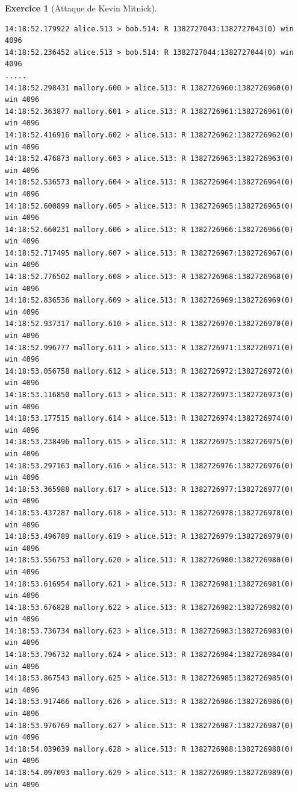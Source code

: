 \documentclass[a4paper,9pt]{article}
\theoremstyle{plain}
\theoremstyle{definition}
\newtheorem{exercice}{Exercice}
\begin{document}
\begin{exercice}[Attaque de Kevin Mitnick]
\begin{verbatim}
14:18:52.179922 alice.513 > bob.514: R 1382727043:1382727043(0) win 4096
14:18:52.236452 alice.513 > bob.514: R 1382727044:1382727044(0) win 4096
.....
14:18:52.298431 mallory.600 > alice.513: R 1382726960:1382726960(0) win 4096
14:18:52.363877 mallory.601 > alice.513: R 1382726961:1382726961(0) win 4096
14:18:52.416916 mallory.602 > alice.513: R 1382726962:1382726962(0) win 4096
14:18:52.476873 mallory.603 > alice.513: R 1382726963:1382726963(0) win 4096
14:18:52.536573 mallory.604 > alice.513: R 1382726964:1382726964(0) win 4096
14:18:52.600899 mallory.605 > alice.513: R 1382726965:1382726965(0) win 4096
14:18:52.660231 mallory.606 > alice.513: R 1382726966:1382726966(0) win 4096
14:18:52.717495 mallory.607 > alice.513: R 1382726967:1382726967(0) win 4096
14:18:52.776502 mallory.608 > alice.513: R 1382726968:1382726968(0) win 4096
14:18:52.836536 mallory.609 > alice.513: R 1382726969:1382726969(0) win 4096
14:18:52.937317 mallory.610 > alice.513: R 1382726970:1382726970(0) win 4096
14:18:52.996777 mallory.611 > alice.513: R 1382726971:1382726971(0) win 4096
14:18:53.056758 mallory.612 > alice.513: R 1382726972:1382726972(0) win 4096
14:18:53.116850 mallory.613 > alice.513: R 1382726973:1382726973(0) win 4096
14:18:53.177515 mallory.614 > alice.513: R 1382726974:1382726974(0) win 4096
14:18:53.238496 mallory.615 > alice.513: R 1382726975:1382726975(0) win 4096
14:18:53.297163 mallory.616 > alice.513: R 1382726976:1382726976(0) win 4096
14:18:53.365988 mallory.617 > alice.513: R 1382726977:1382726977(0) win 4096
14:18:53.437287 mallory.618 > alice.513: R 1382726978:1382726978(0) win 4096
14:18:53.496789 mallory.619 > alice.513: R 1382726979:1382726979(0) win 4096
14:18:53.556753 mallory.620 > alice.513: R 1382726980:1382726980(0) win 4096
14:18:53.616954 mallory.621 > alice.513: R 1382726981:1382726981(0) win 4096
14:18:53.676828 mallory.622 > alice.513: R 1382726982:1382726982(0) win 4096
14:18:53.736734 mallory.623 > alice.513: R 1382726983:1382726983(0) win 4096
14:18:53.796732 mallory.624 > alice.513: R 1382726984:1382726984(0) win 4096
14:18:53.867543 mallory.625 > alice.513: R 1382726985:1382726985(0) win 4096
14:18:53.917466 mallory.626 > alice.513: R 1382726986:1382726986(0) win 4096
14:18:53.976769 mallory.627 > alice.513: R 1382726987:1382726987(0) win 4096
14:18:54.039039 mallory.628 > alice.513: R 1382726988:1382726988(0) win 4096
14:18:54.097093 mallory.629 > alice.513: R 1382726989:1382726989(0) win 4096
\end{verbatim}

\end{exercice}
\end{document}

